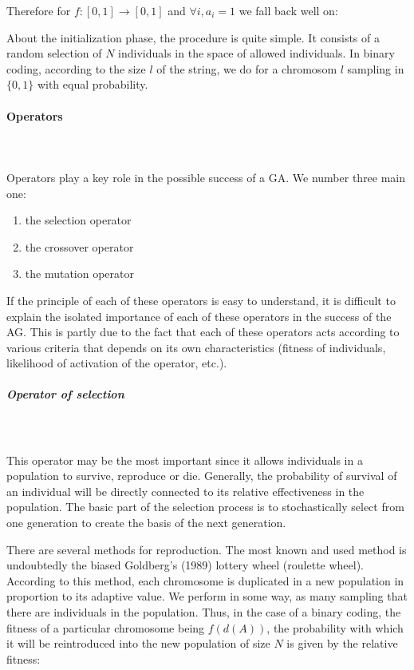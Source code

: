 	Therefore for $f:[0,1]\rightarrow [0,1]$ and $\forall i,a_i=1$ we fall back well on:
	
	About the initialization phase, the procedure is quite simple. It consists of a random selection of $N$ individuals in the space of allowed individuals. In binary coding, according to the size $l$ of the string, we do for a chromosom $l$ sampling in $\{0,1\}$ with equal probability.
	
	\paragraph{Operators}\mbox{}\\\\
	Operators play a key role in the possible success of a GA. We number three main one: 
		\begin{enumerate}
			\item the selection operator
			\item the crossover operator
			\item the mutation operator
		\end{enumerate}
	If the principle of each of these operators is easy to understand, it is difficult to explain the isolated importance of each of these operators in the success of the AG. This is partly due to the fact that each of these operators acts according to various criteria that depends on its own characteristics (fitness of individuals, likelihood of activation of the operator, etc.).
		
	\pagebreak
	\subparagraph{Operator of selection}\mbox{}\\\\
	This operator may be the most important since it allows individuals in a population to survive, reproduce or die. Generally, the probability of survival of an individual will be directly connected to its relative effectiveness in the population.  The basic part of the selection process is to stochastically select from one generation to create the basis of the next generation. 

	There are several methods for reproduction.  The most known and used method is undoubtedly the biased Goldberg's (1989) lottery wheel (roulette wheel). According to this method, each chromosome is duplicated in a new population in proportion to its adaptive value. We perform in some way, as many sampling that there are individuals in the population. Thus, in the case of a binary coding, the fitness of a particular chromosome being $f (d (A))$, the probability with which it will be reintroduced into the new population of size $N$ is given by the relative fitness:
	

